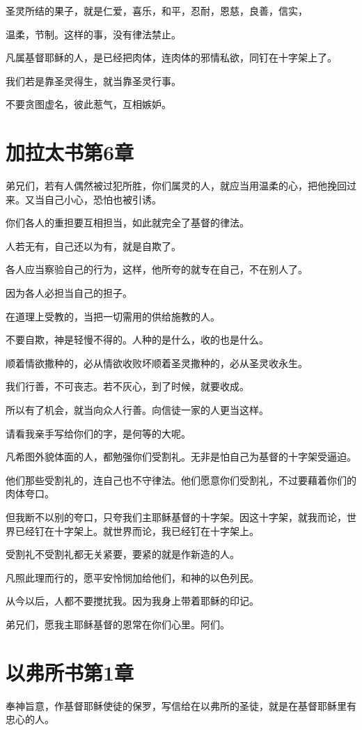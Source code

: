 \documentclass[12pt,oneside]{book}
\begin{document}
圣灵所结的果子，就是仁爱，喜乐，和平，忍耐，恩慈，良善，信实，

温柔，节制。这样的事，没有律法禁止。

凡属基督耶稣的人，是已经把肉体，连肉体的邪情私欲，同钉在十字架上了。

我们若是靠圣灵得生，就当靠圣灵行事。

不要贪图虚名，彼此惹气，互相嫉妒。

\chapter{加拉太书第6章}
弟兄们，若有人偶然被过犯所胜，你们属灵的人，就应当用温柔的心，把他挽回过来。又当自己小心，恐怕也被引诱。

你们各人的重担要互相担当，如此就完全了基督的律法。

人若无有，自己还以为有，就是自欺了。

各人应当察验自己的行为，这样，他所夸的就专在自己，不在别人了。

因为各人必担当自己的担子。

在道理上受教的，当把一切需用的供给施教的人。

不要自欺，神是轻慢不得的。人种的是什么，收的也是什么。

顺着情欲撒种的，必从情欲收败坏顺着圣灵撒种的，必从圣灵收永生。

我们行善，不可丧志。若不灰心，到了时候，就要收成。

所以有了机会，就当向众人行善。向信徒一家的人更当这样。

请看我亲手写给你们的字，是何等的大呢。

凡希图外貌体面的人，都勉强你们受割礼。无非是怕自己为基督的十字架受逼迫。

他们那些受割礼的，连自己也不守律法。他们愿意你们受割礼，不过要藉着你们的肉体夸口。

但我断不以别的夸口，只夸我们主耶稣基督的十字架。因这十字架，就我而论，世界已经钉在十字架上。就世界而论，我已经钉在十字架上。

受割礼不受割礼都无关紧要，要紧的就是作新造的人。

凡照此理而行的，愿平安怜悯加给他们，和神的以色列民。

从今以后，人都不要搅扰我。因为我身上带着耶稣的印记。

弟兄们，愿我主耶稣基督的恩常在你们心里。阿们。

\chapter{以弗所书第1章}
奉神旨意，作基督耶稣使徒的保罗，写信给在以弗所的圣徒，就是在基督耶稣里有忠心的人。
\end{document}
